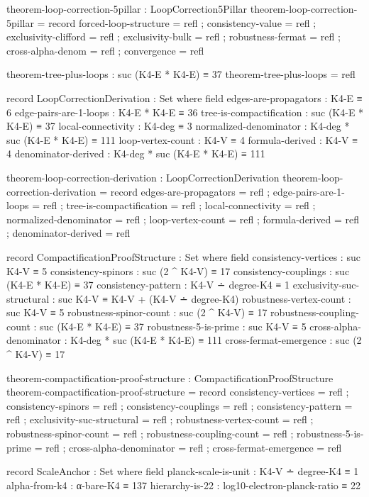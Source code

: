 \documentclass[11pt,a4paper]{book}
\begin{document}
\begin{code}
theorem-loop-correction-5pillar : LoopCorrection5Pillar
theorem-loop-correction-5pillar = record
  { forced-loop-structure = refl
  ; consistency-value = refl
  ; exclusivity-clifford = refl
  ; exclusivity-bulk = refl
  ; robustness-fermat = refl
  ; cross-alpha-denom = refl
  ; convergence = refl
  }

theorem-tree-plus-loops : suc (K4-E * K4-E) ≡ 37
theorem-tree-plus-loops = refl



record LoopCorrectionDerivation : Set where
  field
    edges-are-propagators : K4-E ≡ 6
    edge-pairs-are-1-loops : K4-E * K4-E ≡ 36
    tree-is-compactification : suc (K4-E * K4-E) ≡ 37
    local-connectivity : K4-deg ≡ 3
    normalized-denominator : K4-deg * suc (K4-E * K4-E) ≡ 111
    loop-vertex-count : K4-V ≡ 4
    formula-derived : K4-V ≡ 4
    denominator-derived : K4-deg * suc (K4-E * K4-E) ≡ 111

theorem-loop-correction-derivation : LoopCorrectionDerivation
theorem-loop-correction-derivation = record
  { edges-are-propagators = refl
  ; edge-pairs-are-1-loops = refl
  ; tree-is-compactification = refl
  ; local-connectivity = refl
  ; normalized-denominator = refl
  ; loop-vertex-count = refl
  ; formula-derived = refl
  ; denominator-derived = refl
  }

record CompactificationProofStructure : Set where
  field
    consistency-vertices : suc K4-V ≡ 5
    consistency-spinors : suc (2 ^ K4-V) ≡ 17
    consistency-couplings : suc (K4-E * K4-E) ≡ 37
    consistency-pattern : K4-V ∸ degree-K4 ≡ 1
    exclusivity-suc-structural : suc K4-V ≡ K4-V + (K4-V ∸ degree-K4)
    robustness-vertex-count : suc K4-V ≡ 5
    robustness-spinor-count : suc (2 ^ K4-V) ≡ 17
    robustness-coupling-count : suc (K4-E * K4-E) ≡ 37
    robustness-5-is-prime : suc K4-V ≡ 5
    cross-alpha-denominator : K4-deg * suc (K4-E * K4-E) ≡ 111
    cross-fermat-emergence : suc (2 ^ K4-V) ≡ 17

theorem-compactification-proof-structure : CompactificationProofStructure
theorem-compactification-proof-structure = record
  { consistency-vertices = refl
  ; consistency-spinors = refl
  ; consistency-couplings = refl
  ; consistency-pattern = refl
  ; exclusivity-suc-structural = refl
  ; robustness-vertex-count = refl
  ; robustness-spinor-count = refl
  ; robustness-coupling-count = refl
  ; robustness-5-is-prime = refl
  ; cross-alpha-denominator = refl
  ; cross-fermat-emergence = refl
  }

record ScaleAnchor : Set where
  field
    planck-scale-is-unit : K4-V ∸ degree-K4 ≡ 1
    alpha-from-k4 : α-bare-K4 ≡ 137
    hierarchy-is-22 : log10-electron-planck-ratio ≡ 22


\end{code}
\end{document}
